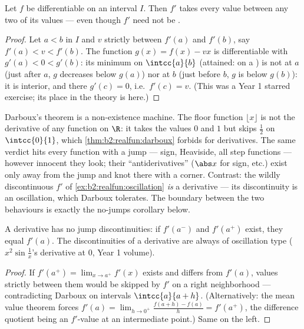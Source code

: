 \begin{theorem}[Darboux]\label{thm:b2:realfun:darboux}
Let $f$ be differentiable on an interval $I$. Then $f'$ takes every
value between any two of its values --- even though $f'$ need not be
.
\end{theorem}

\begin{proof}
Let $a < b$ in $I$ and $v$ strictly between $f'(a)$ and $f'(b)$,
say $f'(a) < v < f'(b)$. The function $g(x) = f(x) - vx$ is
differentiable with $g'(a) < 0 < g'(b)$: its minimum on
$\intcc{a}{b}$ (attained:  on a ) is not at $a$
(just after $a$, $g$ decreases below $g(a)$) nor at $b$ (just
before $b$, $g$ is below $g(b)$): it is interior, and there $g'(c)
= 0$, i.e.\ $f'(c) = v$. (This was a Year 1 starred exercise; its
place in the theory is here.)
\end{proof}

\begin{example}\label{ex:b2:realfun:whichderivatives}
Darboux's theorem is a non-existence machine. The floor function
$\lfloor x\rfloor$ is not the derivative of any function on
$\R$: it takes the values $0$ and $1$ but skips $\frac12$ on
$\intcc{0}{1}$, which \cref{thm:b2:realfun:darboux} forbids for
derivatives. The same verdict hits every function with a jump
--- sign, Heaviside, all step functions --- however innocent
they look; their ``antiderivatives'' ($\abs x$ for sign, etc.)
exist only away from the jump and knot there with a corner.
Contrast: the wildly discontinuous $f'$ of
\cref{ex:b2:realfun:oscillation} \emph{is} a derivative --- its
discontinuity is an oscillation, which Darboux tolerates. The
boundary between the two behaviours is exactly the
no-jumps corollary below.
\end{example}

\begin{corollary}\label{cor:b2:realfun:nojumps}
A derivative has no jump discontinuities: if $f'(a^-)$ and
$f'(a^+)$ exist, they equal $f'(a)$. The discontinuities of a
derivative are always of oscillation type ($x^2\sin\frac1x$'s
derivative at $0$, Year 1 volume).
\end{corollary}

\begin{proof}
If $f'(a^+) = \lim_{x\to a^+} f'(x)$ exists and differs from
$f'(a)$, values strictly between them would be skipped by $f'$ on
a right neighborhood --- contradicting Darboux on intervals
$\intcc{a}{a + h}$. (Alternatively: the mean value theorem forces
$f'(a) = \lim_{h\to0^+} \frac{f(a+h)-f(a)}{h} = f'(a^+)$, the
difference quotient being an $f'$-value at an intermediate point.)
Same on the left.
\end{proof}

